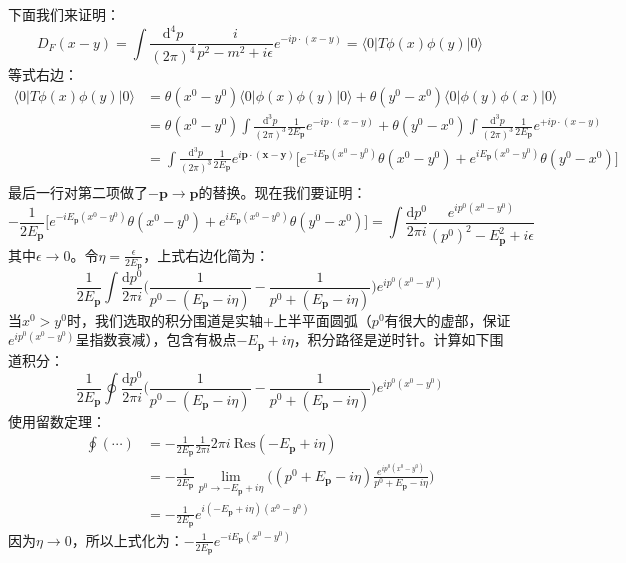\documentclass{book}
\begin{document}
下面我们来证明：
$$
D_F(x-y)=\int\frac{\mathrm{d}^4p}{(2\pi)^4}\frac{i}{p^2-m^2+i\epsilon}e^{-ip\cdot(x-y)}=\langle0|T\phi(x)\phi(y)|0\rangle
$$
等式右边：
$$
\begin{aligned}
\langle0|T\phi(x)\phi(y)|0\rangle&=
\theta(x^0-y^0)\langle0|\phi(x)\phi(y)|0\rangle+\theta(y^0-x^0)\langle0|\phi(y)\phi(x)|0\rangle\\
&=\theta(x^0-y^0){\int\frac{\mathrm{d}^3p}{(2\pi)^3}\frac1{2E_{\mathbf{p}}}e^{-ip\cdot(x-y)}}+\theta(y^0-x^0){\int\frac{\mathrm{d}^3p}{(2\pi)^3}\frac1{2E_{\mathbf{p}}}e^{+ip\cdot(x-y)}} \\
&={\int\frac{\mathrm{d}^3p}{(2\pi)^3}\frac1{2E_{\mathbf{p}}}}e^{i\mathbf{p}\cdot(\mathbf{x}-\mathbf{y})}\Big[e^{-iE_\mathbf{p}(x^0-y^0)}\theta(x^0-y^0)+e^{iE_\mathbf{p}(x^0-y^0)}\theta(y^0-x^0)\Big] \\
\end{aligned}
$$
最后一行对第二项做了$-\mathbf{p}\to\mathbf{p}$的替换。现在我们要证明：
$$
-\frac1{2E_{\mathbf{p}}}\Big[e^{-iE_\mathbf{p}(x^0-y^0)}\theta(x^0-y^0)+e^{iE_\mathbf{p}(x^0-y^0)}\theta(y^0-x^0)\Big] =\int\frac{\mathrm{d}p^0}{2\pi i}\frac{e^{ip^0(x^0-y^0)}}{(p^0)^2-E_\mathbf{p}^2+i\epsilon}
$$
其中$\epsilon\to 0$。令$\eta=\frac{\epsilon}{2E_\mathbf{p}}$，上式右边化简为：
$$
\frac{1}{2E_\mathbf{p}}\int\frac{\mathrm{d}p^0}{2\pi i}\Big(\frac{1}{p^0-(E_\mathbf{p}-i\eta)}-\frac{1}{p^0+(E_\mathbf{p}-i\eta)}\Big)e^{ip^0(x^0-y^0)}
$$
当$x^0>y^0$时，我们选取的积分围道是实轴+上半平面圆弧（$p^0$有很大的虚部，保证$e^{ip^0(x^0-y^0)}$呈指数衰减），包含有极点$-E_\mathbf{p}+i\eta$，积分路径是逆时针。计算如下围道积分：
$$
\frac{1}{2E_\mathbf{p}}\oint\frac{\mathrm{d}p^0}{2\pi i}\Big(\frac{1}{p^0-(E_\mathbf{p}-i\eta)}-\frac{1}{p^0+(E_\mathbf{p}-i\eta)}\Big)e^{ip^0(x^0-y^0)}
$$
使用留数定理：
$$
\begin{aligned}
\oint(\cdots)&=-\frac{1}{2E_{\mathbf{p}}}\frac{1}{2\pi i}2\pi i\ \mathrm{Res}(-E_\mathbf{p}+i\eta)\\&=-\frac{1}{2E_{\mathbf{p}}}\lim_{p^0\to-E_\mathbf{p}+i\eta}\Big((p^0+E_\mathbf{p}-i\eta)\frac{e^{ip^0(x^0-y^0)}}{p^0+E_\mathbf{p}-i\eta}\Big) \\
&=-\frac{1}{2E_{\mathbf{p}}}e^{i(-E_\mathbf{p}+i\eta)(x^0-y^0)}
\end{aligned}
$$
因为$\eta\to 0$，所以上式化为：$-\frac{1}{2E_{\mathbf{p}}}e^{-iE_\mathbf{p}(x^0-y^0)}$
\end{document}
